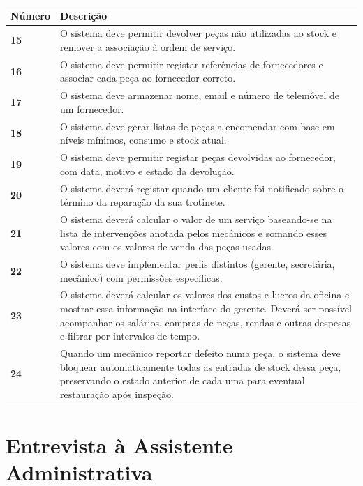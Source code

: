 \documentclass[11pt,a4paper]{article}
\begin{document}
	\begin{tabularx}{\textwidth}{@{}|l|X|@{}}
		\hline
		\rowcolor{gray!10} \textbf{Número} & \textbf{Descrição} \\ \hline
		
		\textbf{15}  & O sistema deve permitir devolver peças não utilizadas ao stock e remover a associação à ordem de serviço. \\ \hline
		\textbf{16}  & O sistema deve permitir registar referências de fornecedores e associar cada peça ao fornecedor correto. \\ \hline
		\textbf{17}  & O sistema deve armazenar nome, email e número de telemóvel de um fornecedor. \\ \hline
		\textbf{18}  & O sistema deve gerar listas de peças a encomendar com base em níveis mínimos, consumo e stock atual. \\ \hline
		\textbf{19}  & O sistema deve permitir registar peças devolvidas ao fornecedor, com data, motivo e estado da devolução. \\ \hline
		\textbf{20}  & O sistema deverá registar quando um cliente foi notificado sobre o término da reparação da sua trotinete. \\ \hline
		\textbf{21}  & O sistema deverá calcular o valor de um serviço baseando-se na lista de intervenções anotada pelos mecânicos e somando esses valores com os valores de venda das peças usadas. \\ \hline
		\textbf{22}  & O sistema deve implementar perfis distintos (gerente, secretária, mecânico) com permissões específicas. \\ \hline
		\textbf{23} & O sistema deverá calcular os valores dos custos e lucros da oficina e mostrar essa informação na interface do gerente. Deverá ser possível acompanhar os salários, compras de peças, rendas e outras despesas e filtrar por intervalos de tempo. \\ \hline
		\textbf{24} & Quando um mecânico reportar defeito numa peça, o sistema deve bloquear automaticamente todas as entradas de stock dessa peça, preservando o estado anterior de cada uma para eventual restauração após inspeção. \\ \hline
	\end{tabularx}
	
	\vspace{1cm}
	
	\section*{Entrevista à Assistente Administrativa}
	
\end{document}
